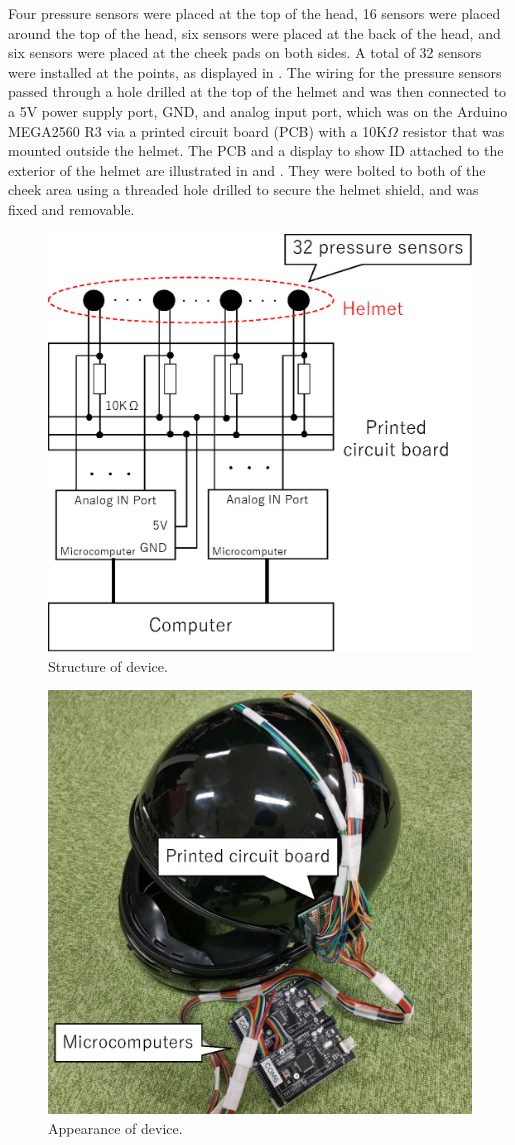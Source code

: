 \documentclass[english,preprint,JIP]{ipsj}
\begin{document}
Four pressure sensors were placed at the top of the head, 16 sensors were placed around the top of the head, six sensors were placed at the back of the head, and six sensors were placed at the cheek pads on both sides. A total of 32 sensors were installed at the points, as displayed in . The wiring for the pressure sensors passed through a hole drilled at the top of the helmet and was then connected to a 5V power supply port, GND, and analog input port, which was on the Arduino MEGA2560 R3 via a printed circuit board (PCB) with a 10K$\Omega$ resistor that was mounted outside the helmet. The PCB and a display to show ID attached to the exterior of the helmet are illustrated in  and . They were bolted to both of the cheek area using a threaded hole drilled to secure the helmet shield, and was fixed and removable.

\begin{figure}[!t]
  \begin{center}
    \includegraphics[width=0.6\linewidth]{figure/device.eps}
  \end{center}
  \caption{Structure of device.}
  \label{fig:device}
\end{figure}

\begin{figure}[!t]
  \centering
    \includegraphics[width=0.5\linewidth]{figure/met_over.eps}
  \caption{Appearance of device.}
  \label{fig:met_over}
\end{figure}
\end{document}
